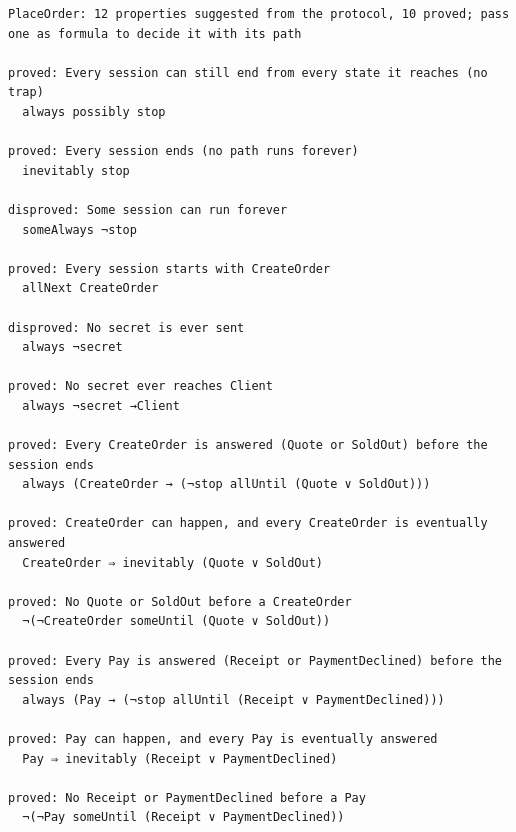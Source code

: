 \begin{lstlisting}[language={},basicstyle=\ttfamily\footnotesize,breaklines=true]
PlaceOrder: 12 properties suggested from the protocol, 10 proved; pass one as formula to decide it with its path

proved: Every session can still end from every state it reaches (no trap)
  always possibly stop

proved: Every session ends (no path runs forever)
  inevitably stop

disproved: Some session can run forever
  someAlways ¬stop

proved: Every session starts with CreateOrder
  allNext CreateOrder

disproved: No secret is ever sent
  always ¬secret

proved: No secret ever reaches Client
  always ¬secret →Client

proved: Every CreateOrder is answered (Quote or SoldOut) before the session ends
  always (CreateOrder → (¬stop allUntil (Quote ∨ SoldOut)))

proved: CreateOrder can happen, and every CreateOrder is eventually answered
  CreateOrder ⇒ inevitably (Quote ∨ SoldOut)

proved: No Quote or SoldOut before a CreateOrder
  ¬(¬CreateOrder someUntil (Quote ∨ SoldOut))

proved: Every Pay is answered (Receipt or PaymentDeclined) before the session ends
  always (Pay → (¬stop allUntil (Receipt ∨ PaymentDeclined)))

proved: Pay can happen, and every Pay is eventually answered
  Pay ⇒ inevitably (Receipt ∨ PaymentDeclined)

proved: No Receipt or PaymentDeclined before a Pay
  ¬(¬Pay someUntil (Receipt ∨ PaymentDeclined))
\end{lstlisting}
